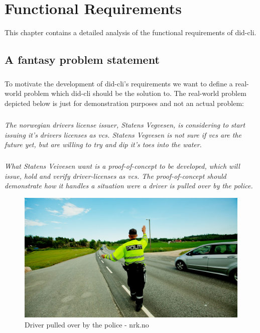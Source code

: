 \chapter{Functional Requirements}

This chapter contains a detailed analysis of the functional requirements of \acrshort{did-cli}.

\section{A fantasy problem statement}

\paragraph{}
To motivate the development of \acrshort{did-cli}'s requirements we want to define a real-world problem which \acrshort{did-cli} should be the solution to. The real-world problem depicted below is just for demonstration purposes and not an actual problem:

\paragraph{}
\textit{The norwegian drivers license issuer, Statens Vegvesen, is considering to start issuing it's drivers licenses as \acrfull{vc}s. Statens Vegvesen is not sure if \acrshort{vc}s are the future yet, but are willing to try and dip it's toes into the water.}

\paragraph{}
\textit{What Statens Veivesen want is a proof-of-concept to be developed, which will issue, hold and verify driver-licenses as \acrfull{vc}s. The proof-of-concept should demonstrate how it handles a situation were a driver is pulled over by the police.}


    \begin{figure}[htbp]
      \centering
      \includegraphics[width=.65\textwidth]{figures/politikontrollnrk.jpg}
      \caption[]{Driver pulled over by the police - nrk.no}
    \end{figure}




